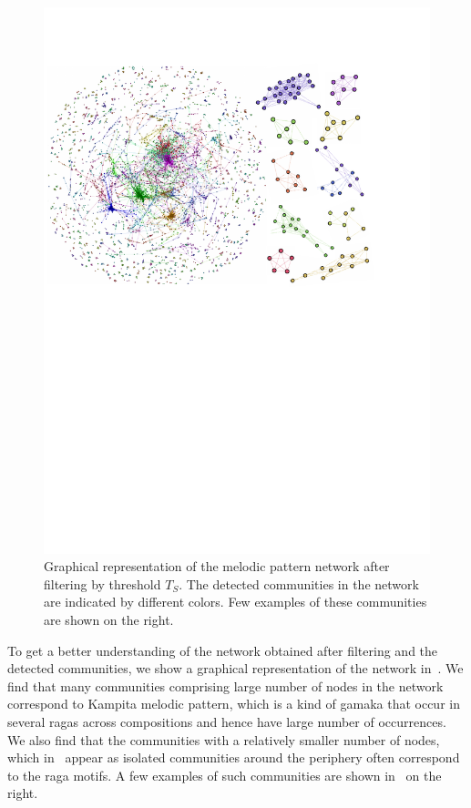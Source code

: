 {\begin{figure}
	\begin{center}
		\includegraphics[width=\figSizeHundred]{ch06_patterns/figures/Characterization/networkWithClusters.pdf}
	\end{center}
 \caption{Graphical representation of the melodic pattern network after filtering by threshold $T_S$. The detected communities in the network are indicated by different colors. Few examples of these communities are shown on the right.}
 \label{fig:network_and_communities_pattern_characterization}
\end{figure}

To get a better understanding of the network obtained after filtering and the detected communities, we show a graphical representation of the network in~. We find that many communities comprising large number of nodes in the network correspond to Kampita melodic pattern, which is a kind of \gls{gamaka} that occur in several \glspl{raga} across compositions and hence have large number of occurrences. We also find that the communities with a relatively smaller number of nodes, which in~ appear as isolated communities around the periphery often correspond to the \gls{raga} motifs. A few examples of such communities are shown in~ on the right.

}
